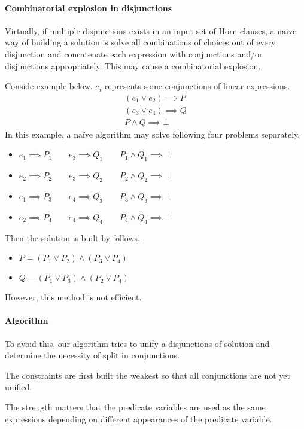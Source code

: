 \documentclass[a4paper,12pt]{article}
\begin{document}
\paragraph{Combinatorial explosion in disjunctions}
Virtually, if multiple disjunctions exists in an input set of Horn
clauses, a na\"{i}ve way of building a solution is solve all
combinations of choices out of every disjunction and concatenate each
expression with conjunctions and/or disjunctions appropriately.  This
may cause a combinatorial explosion.

Conside example below. $e_i$ represents some conjunctions of linear
expressions.
\begin{align*}
(e_1 \vee e_2) \implies P \\ (e_3 \vee e_4) \implies Q \\ P \wedge Q \implies \bot
\end{align*}
In this example, a na\"{i}ve algorithm may solve following four
problems separately.
\begin{itemize}
\item $e_1 \implies P_1 \qquad e_3 \implies Q_1 \qquad P_1 \wedge Q_1 \implies \bot$
\item $e_2 \implies P_2 \qquad e_3 \implies Q_2 \qquad P_2 \wedge Q_2 \implies \bot$
\item $e_1 \implies P_3 \qquad e_4 \implies Q_3 \qquad P_3 \wedge Q_3 \implies \bot$
\item $e_2 \implies P_4 \qquad e_4 \implies Q_4 \qquad P_4 \wedge Q_4 \implies \bot$
\end{itemize}
Then the solution is built by follows.
\begin{itemize}
\item $P = ( P_1 \vee P_2 ) \wedge ( P_3 \vee P_4 )$
\item $Q = ( P_1 \vee P_3 ) \wedge ( P_2 \vee P_4 )$
\end{itemize}
However, this method is not efficient.

\paragraph{Algorithm}
To avoid this, our algorithm tries to unify a disjunctions of solution
and determine the necessity of split in conjunctions.

The constraints are first built the weakest so that all conjunctions
are not yet unified.

The strength matters that the
predicate variables are used as the same expressions depending on
different appearances of the predicate variable.
\end{document}
